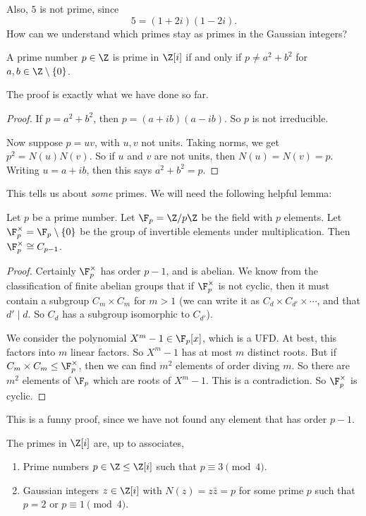 \documentclass[a4paper]{article}
\begin{document}
Also, $5$ is not prime, since
\[
  5 = (1 + 2i)(1 - 2i).
\]
How can we understand which primes stay as primes in the Gaussian integers?
\begin{prop}
  A prime number $p \in \Z$ is prime in $\Z[i]$ if and only if $p \not= a^2 + b^2$ for $a, b \in \Z \setminus \{0\}$.
\end{prop}
The proof is exactly what we have done so far.

\begin{proof}
  If $p = a^2 + b^2$, then $p = (a + ib)(a - ib)$. So $p$ is not irreducible.

  Now suppose $p = uv$, with $u, v$ not units. Taking norms, we get $p^2 = N(u) N(v)$. So if $u$ and $v$ are not units, then $N(u) = N(v) = p$. Writing $u = a + ib$, then this says $a^2 + b^2 = p$.
\end{proof}

This tells us about \emph{some} primes. We will need the following helpful lemma:

\begin{lemma}
  Let $p$ be a prime number. Let $\F_p = \Z/p\Z$ be the field with $p$ elements. Let $\F_p^\times = \F_p\setminus \{0\}$ be the group of invertible elements under multiplication. Then $\F_p^\times \cong C_{p - 1}$.
\end{lemma}

\begin{proof}
  Certainly $\F_p^\times$ has order $p - 1$, and is abelian. We know from the classification of finite abelian groups that if $\F_p^\times$ is not cyclic, then it must contain a subgroup $C_m \times C_m$ for $m > 1$ (we can write it as $C_d \times C_{d'} \times \cdots$, and that $d' \mid d$. So $C_d$ has a subgroup isomorphic to $C_{d'}$).

  We consider the polynomial $X^m - 1 \in \F_p[x]$, which is a UFD. At best, this factors into $m$ linear factors. So $X^m - 1$ has at most $m$ distinct roots. But if $C_m \times C_m \leq \F_p^\times$, then we can find $m^2$ elements of order diving $m$. So there are $m^2$ elements of $\F_p$ which are roots of $X^m - 1$. This is a contradiction. So $\F_p^\times$ is cyclic.
\end{proof}

This is a funny proof, since we have not found any element that has order $p - 1$.

\begin{prop}
  The primes in $\Z[i]$ are, up to associates,
  \begin{enumerate}
    \item Prime numbers $p \in \Z \leq \Z[i]$ such that $p\equiv 3 \pmod 4$.
    \item Gaussian integers $z \in \Z[i]$ with $N(z) = z\bar{z} = p$ for some prime $p$ such that $p = 2$ or $p \equiv 1 \pmod 4$.
  \end{enumerate}
\end{prop}
\end{document}
